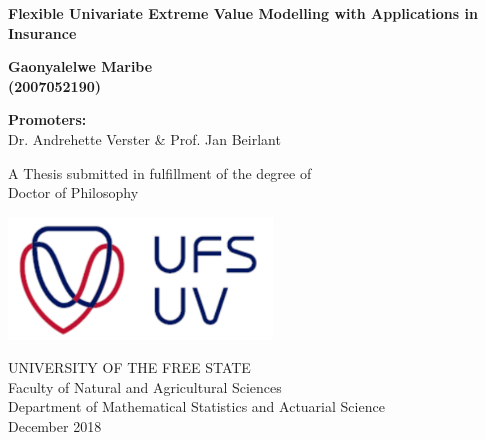 
\setcounter{page}{1}

\newpage

\thispagestyle{empty}
\begin{center}
{\Huge \bf Flexible Univariate Extreme Value Modelling with Applications in Insurance\par}
 
  \vspace*{1cm}
  
  {\large\bf Gaonyalelwe Maribe\\(2007052190)}\\
  
 \vspace*{2cm}
 
\textbf{Promoters:}\\
Dr. Andrehette Verster \& Prof. Jan Beirlant

  \vfill

  {\Large A Thesis submitted in fulfillment of the degree of\\
         [1mm] Doctor of Philosophy}
  \vspace*{0.4cm}
  
   \begin{center}
   \includegraphics[width=7cm]{UFS.pdf}
   \end{center}

  {\large UNIVERSITY OF THE FREE STATE\\
          [-3mm] Faculty of Natural and Agricultural Sciences\\
          [-3mm] Department of Mathematical Statistics and Actuarial Science\\
          [1mm]  December 2018}

\end{center}

